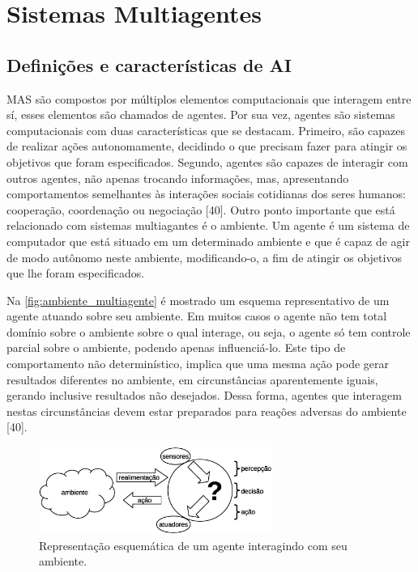 \documentclass[journal]{IEEEtran}
\begin{document}
\section{Sistemas Multiagentes}

\subsection{Definições e características de AI}

MAS são compostos por múltiplos elementos computacionais que interagem entre sí, esses elementos são chamados de agentes. Por sua vez, agentes são sistemas computacionais com duas características que se destacam. Primeiro, são capazes de realizar ações autonomamente, decidindo o que precisam fazer para atingir os objetivos que foram especificados. Segundo, agentes são capazes de interagir com outros agentes, não apenas trocando informações, mas, apresentando comportamentos semelhantes às interações sociais cotidianas dos seres humanos: cooperação, coordenação ou negociação [40].
Outro ponto importante que está relacionado com sistemas multiagantes é o ambiente. Um agente é um sistema de computador que está situado em um determinado ambiente e que é capaz de agir de modo autônomo neste ambiente, modificando-o, a fim de atingir os objetivos que lhe foram especificados.

Na \autoref{fig:ambiente_multiagente} é mostrado um esquema representativo de um agente atuando sobre seu ambiente. Em muitos casos o agente não tem total domínio sobre o ambiente sobre o qual interage, ou seja, o agente só tem controle parcial sobre o ambiente, podendo apenas influenciá-lo. Este tipo de comportamento não determinístico, implica que uma mesma ação pode gerar resultados diferentes no ambiente, em circunstâncias aparentemente iguais, gerando inclusive resultados não desejados. Dessa forma, agentes que interagem nestas circunstâncias devem estar preparados para reações adversas do ambiente [40].

\begin{figure}[htb]
    \centering
    \includegraphics[width=3.0in]{Figuras/ambiente_agente.eps}
    \caption{\label{fig:ambiente_multiagente}Representação esquemática de um agente interagindo com seu ambiente.}
\end{figure}
\end{document}
